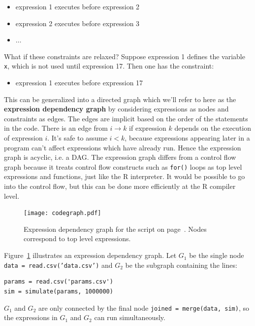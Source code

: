 \documentclass[12pt]{article}
\begin{document}
\begin{itemize}
    \item expression 1 executes before expression 2
    \item expression 2 executes before expression 3
    \item $\dots$
\end{itemize}
What if these constraints are relaxed? Suppose expression 1 defines the variable
\texttt{x}, which is not used until expression 17. Then one has the
constraint:
\begin{itemize}
    \item expression 1 executes before expression 17
\end{itemize}
This can be generalized into a directed graph which we'll refer to here as
the \textbf{expression dependency graph} by considering expressions as
nodes and constraints as edges. The edges are implicit based on the order
of the statements in the code. There is an edge from $i \rightarrow k$ if
expression $k$ depends on the execution of expression $i$.  It's safe to
assume $i < k$, because expressions appearing later in a program can't
affect expressions which have already run. Hence the expression graph is
acyclic, i.e. a DAG. The expression graph differs from a control flow
graph because it treats control flow constructs such as \texttt{for()}
loops as top level expressions and functions, just like the R interpreter.
It would be possible to go into the control flow, but this can be done more
efficiently at the R compiler level.



\begin{figure}
  \centering
  \texttt{[image: codegraph.pdf]}
  \caption{Expression dependency graph for the script on
  page~\pageref{list:simple}. Nodes correspond to top level expressions.}
  \label{fig:codegraph}
\end{figure}

Figure~\ref{fig:codegraph} illustrates an expression dependency graph.
Let $G_1$ be the single node \texttt{data = read.csv('data.csv')} and $G_2$ be the subgraph containing the lines:
\begin{verbatim}
params = read.csv('params.csv')
sim = simulate(params, 1000000)
\end{verbatim}
$G_1$ and $G_2$ are only connected by the final node \texttt{joined =
merge(data, sim)}, so the expressions in $G_1$ and $G_2$ can run simultaneously.
\end{document}
